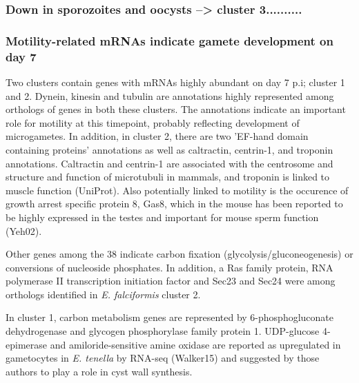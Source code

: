 \documentclass{bmcart}
\begin{document}
\subsubsection*{Down in sporozoites and oocysts -->  cluster 3..........}




\subsubsection*{Motility-related mRNAs indicate gamete development on day 7}
Two clusters contain genes with mRNAs highly abundant on day 7 p.i;
cluster 1 and 2.  Dynein, kinesin and tubulin are annotations highly
represented among orthologs of genes in both these clusters. The
annotations indicate an important role for motility at this timepoint,
probably reflecting development of microgametes.  In addition, in
cluster 2, there are two 'EF-hand domain containing proteins'
annotations as well as caltractin, centrin-1, and troponin
annotations. Caltractin and centrin-1 are associated with the
centrosome and structure and function of microtubuli in mammals, and
troponin is linked to muscle function (UniProt).  Also potentially
linked to motility is the occurence of growth arrest specific protein
8, Gas8, which in the mouse has been reported to be highly expressed
in the testes and important for mouse sperm function (Yeh02).

Other genes among the 38 indicate carbon fixation
(glycolysis/gluconeogenesis) or conversions of nucleoside
phosphates. In addition, a Ras family protein, RNA polymerase II
transcription initiation factor and Sec23 and Sec24 were among
orthologs identified in \textit{E. falciformis} cluster 2.

In cluster 1, carbon metabolism genes are represented by
6-phosphogluconate dehydrogenase and glycogen phosphorylase family
protein 1. UDP-glucose 4-epimerase and amiloride-sensitive amine
oxidase are reported as upregulated in gametocytes in
\textit{E. tenella} by RNA-seq (Walker15) and suggested by those
authors to play a role in cyst wall synthesis.
\end{document}
